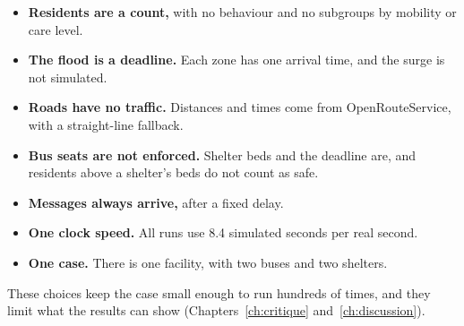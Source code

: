 \begin{itemize}
  \item \textbf{Residents are a count,} with no behaviour and no subgroups by
  mobility or care level.
  \item \textbf{The flood is a deadline.} Each zone has one arrival time, and
  the surge is not simulated.
  \item \textbf{Roads have no traffic.} Distances and times come from
  OpenRouteService, with a straight-line fallback.
  \item \textbf{Bus seats are not enforced.} Shelter beds and the deadline are,
  and residents above a shelter's beds do not count as safe.
  \item \textbf{Messages always arrive,} after a fixed delay.
  \item \textbf{One clock speed.} All runs use 8.4 simulated seconds per real
  second.
  \item \textbf{One case.} There is one facility, with two buses and two
  shelters.
\end{itemize}

These choices keep the case small enough to run hundreds of times, and they
limit what the results can show (Chapters~\ref{ch:critique}
and~\ref{ch:discussion}).
